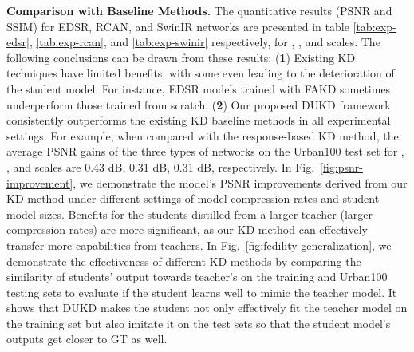 \documentclass[10pt,twocolumn,letterpaper]{article}
\begin{document}
\noindent\textbf{Comparison with Baseline Methods. }
The quantitative results (PSNR and SSIM) for EDSR, RCAN, and SwinIR networks are presented in table \ref{tab:exp-edsr}, \ref{tab:exp-rcan}, and \ref{tab:exp-swinir} respectively, for , , and  scales. The following conclusions can be drawn from these results: (\textbf{1}) Existing KD techniques have limited benefits, with some even leading to the deterioration of the student model. For instance, EDSR models trained with FAKD sometimes underperform those trained from scratch. (\textbf{2}) Our proposed DUKD framework consistently outperforms the existing KD baseline methods in all experimental settings. For example, when compared with the response-based KD method, the average PSNR gains of the three types of networks on the Urban100 test set for , , and  scales are 0.43 dB, 0.31 dB, 0.31 dB, respectively. 
In Fig.~\ref{fig:psnr-improvement}, we demonstrate the model's PSNR improvements derived from our KD method under different settings of model compression rates and student model sizes. Benefits for the students distilled from a larger teacher (larger compression rates) are more significant, as our KD method can effectively transfer more capabilities from teachers. 
In Fig.~\ref{fig:fedility-generalization}, we demonstrate the effectiveness of different KD methods by comparing the similarity of students' output towards teacher's on the training and Urban100 testing sets to evaluate if the student learns well to mimic the teacher model. It shows that DUKD makes the student not only effectively fit the teacher model on the training set but also imitate it on the test sets so that the student model's outputs get closer to GT as well.
\end{document}
